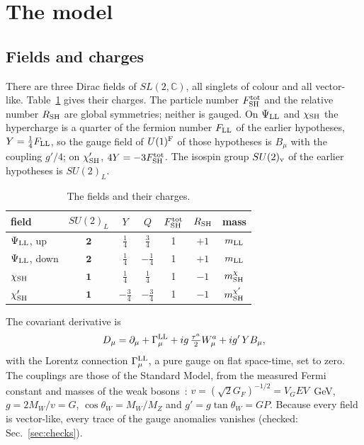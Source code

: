 \documentclass[aps,prd,onecolumn,superscriptaddress,nofootinbib,floatfix,longbibliography]{revtex4-2}
\newcommand{\LL}{{\rm LL}}
\newcommand{\SH}{{\rm SH}}
\begin{document}
\section{The model}
\label{sec:model}

\subsection{Fields and charges}

There are three Dirac fields of $SL(2,\mathbb C)$, all singlets of colour and all vector-like. Table~\ref{tab:fields} gives
their charges. The particle number $F^{\rm tot}_\SH$ and the relative number $R_\SH$ are global symmetries; neither is
gauged. On $\Psi_\LL$ and $\chi_\SH$ the hypercharge is a quarter of the fermion number $F_\LL$ of the earlier hypotheses,
$Y=\frac14F_\LL$, so the gauge field of $U(1)^{\rm F}$ of those hypotheses is $B_\mu$ with the coupling $g'/4$; on
$\chi'_\SH$, $4Y=-3F^{\rm tot}_\SH$. The isospin group $SU(2)_{\rm v}$ of the earlier hypotheses is $SU(2)_L$.

\begin{table}[h]
\caption{\label{tab:fields}The fields and their charges.}
\begin{ruledtabular}
\begin{tabular}{lcccccc}
field & $SU(2)_L$ & $Y$ & $Q$ & $F^{\rm tot}_\SH$ & $R_\SH$ & mass\\
\hline
$\Psi_\LL$, up & $\mathbf 2$ & $\frac14$ & $\frac34$ & 1 & $+1$ & $m_\LL$\\
$\Psi_\LL$, down & $\mathbf 2$ & $\frac14$ & $-\frac14$ & 1 & $+1$ & $m_\LL$\\
$\chi_\SH$ & $\mathbf 1$ & $\frac14$ & $\frac14$ & 1 & $-1$ & $m^\chi_\SH$\\
$\chi'_\SH$ & $\mathbf 1$ & $-\frac34$ & $-\frac34$ & 1 & $-1$ & $m^{\chi'}_\SH$\\
\end{tabular}
\end{ruledtabular}
\end{table}

The covariant derivative is
\begin{equation}
D_\mu=\partial_\mu+\Gamma^\LL_\mu+ig\,\tfrac{\tau^a}{2}W^a_\mu+ig'\,YB_\mu ,
\label{eq:cov}
\end{equation}
with the Lorentz connection $\Gamma^\LL_\mu$, a pure gauge on flat space-time, set to zero. The couplings are those of the
Standard Model, from the measured Fermi constant and masses of the weak bosons~\cite{PDG2026}:
$v=(\sqrt2G_F)^{-1/2}={{V_GEV}}$~GeV, $g=2M_W/v={{G}}$, $\cos\theta_W=M_W/M_Z$ and $g'=g\tan\theta_W={{GP}}$.
Because every field is vector-like, every trace of the gauge anomalies vanishes (checked:
Sec.~\ref{sec:checks}).
\end{document}
